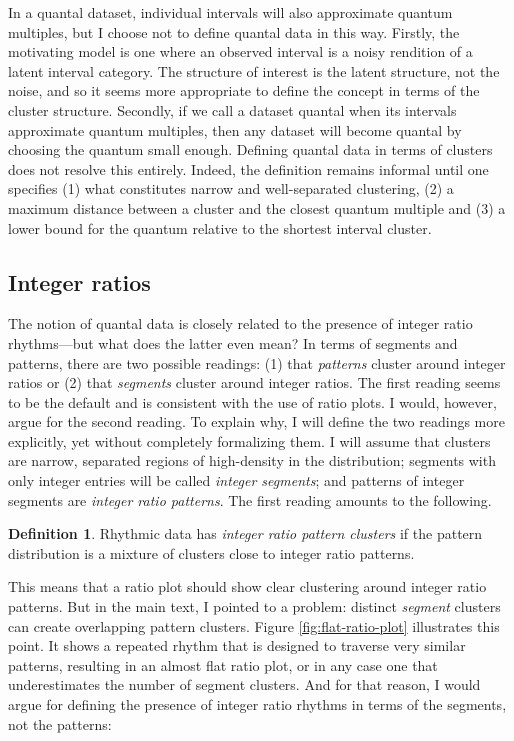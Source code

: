 \documentclass[a4paper]{article}
\theoremstyle{definition}
\newtheorem{definition}{Definition}
\begin{document}
In a quantal dataset, individual intervals will also approximate quantum multiples, but I choose not to define quantal data in this way.
Firstly, the motivating model is one where an observed interval is a noisy rendition of a latent interval category.
The structure of interest is the latent structure, not the noise, and so it seems more appropriate to define the concept in terms of the cluster structure.
Secondly, if we call a dataset quantal when its intervals approximate quantum multiples, then any dataset will become quantal by choosing the quantum small enough.
Defining quantal data in terms of clusters does not resolve this entirely.
Indeed, the definition remains informal until one specifies (1) what constitutes narrow and well-separated clustering, (2) a maximum distance between a cluster and the closest quantum multiple and (3) a lower bound for the quantum relative to the shortest interval cluster.



\subsection{Integer ratios}

The notion of quantal data is closely related to the presence of integer ratio rhythms—but what does the latter even mean?
In terms of segments and patterns, there are two possible readings: (1) that \emph{patterns} cluster around integer ratios or (2) that \emph{segments} cluster around integer ratios.
The first reading seems to be the default and is consistent with the use of ratio plots.
I would, however, argue for the second reading.
To explain why, I will define the two readings more explicitly, yet without completely formalizing them.
I will assume that clusters are narrow, separated regions of high-density in the distribution;
segments with only integer entries will be called \emph{integer segments}; and patterns of integer segments are \emph{integer ratio patterns}. The first reading amounts to the following.


\begin{definition}
  Rhythmic data has \emph{integer ratio pattern clusters} if the pattern distribution is a mixture of clusters close to integer ratio patterns.
\end{definition}

This means that a ratio plot should show clear clustering around integer ratio patterns.
But in the main text, I pointed to a problem: distinct \emph{segment} clusters can create overlapping pattern clusters.
Figure \ref{fig:flat-ratio-plot} illustrates this point. It shows a repeated rhythm that is designed to traverse very similar patterns, resulting in an almost flat ratio plot, or in any case one that underestimates the number of segment clusters.
And for that reason, I would argue for defining the presence of integer ratio rhythms in terms of the segments, not the patterns:
\end{document}
